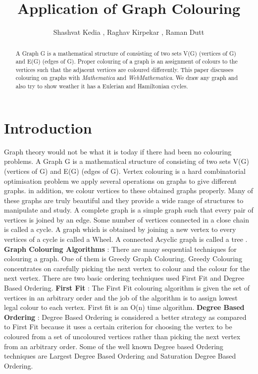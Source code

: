 \documentclass{article}
\begin{document}
\title{Application of Graph Colouring}
\author{Shashvat Kedia , Raghav Kirpekar , Raman Dutt}
\maketitle
\begin{abstract}
A Graph G is a mathematical structure of consisting of two sets V(G) (vertices of G) and E(G) (edges of G). Proper colouring of a graph is an assignment of colours to the vertices such that the adjacent vertices are coloured differently.
This paper discusses colouring on graphs with \textit{Mathematica} and \textit{WebMathematica}. \hfill \break
We draw any graph and also try to show weather it has a Eulerian and Hamiltonian cycles.
\end{abstract}
\section{Introduction}
Graph theory would not be what it is today if there had been no colouring problems. A Graph G is a mathematical structure of consisting of two sets V(G) (vertices of G) and E(G) (edges of G).\hfill \break
Vertex colouring is a hard combinatorial optimisation problem we apply several operations on graphs to give different graphs. in addition, we colour vertices to these obtained graphs properly. Many of these graphs are truly beautiful and they provide a wide range of structures to manipulate and study.\hfill \break
A complete graph is a simple graph such that every pair of vertices is joined by an edge. Some number of vertices connected in a close chain is called a cycle. A graph which is obtained by joining a new vertex to every vertices of a cycle is called a Wheel. A connected Acyclic graph is called a tree \cite{1}. \hfill \break
\textbf{Graph Colouring Algorithms} : There are many sequential techniques for colouring a graph. One of them is Greedy Graph Colouring. Greedy Colouring concentrates on carefully picking the next vertex to colour and the colour for the next vertex. There are two basic ordering techniques used First Fit and Degree Based Ordering.\hfill \break
\textbf{First Fit} : The First Fit colouring algorithm is given the set of vertices in an arbitrary order and the job of the algorithm is to assign lowest legal colour to each vertex. First fit is an O(n) time algorithm. \hfill \break
\textbf{Degree Based Ordering} : Degree Based Ordering is considered a better strategy as compared to First Fit because it uses a certain criterion for choosing the vertex to be coloured from a set of uncoloured vertices rather than picking the next vertex from an arbitrary order. Some of the well known Degree based Ordering techniques are Largest Degree Based Ordering and Saturation Degree Based Ordering.\hfill \break
\end{document}
